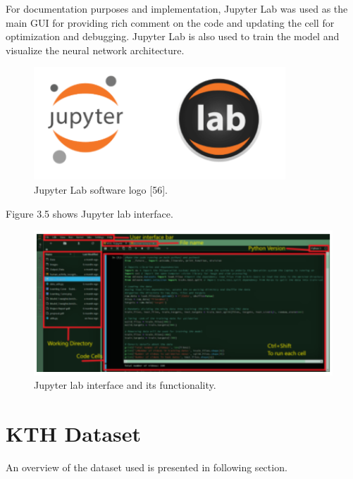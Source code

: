 For documentation purposes and implementation, Jupyter Lab was used as the main GUI for providing rich comment on the code and updating the cell for optimization and debugging. Jupyter Lab is also used to train the model and visualize the neural network architecture.
\begin{figure}[ht]
\centering
\includegraphics{Figures/jupyter_lab}
\decoRule
\caption[Jupyter Lab software logo "56".]{Jupyter Lab software logo [56].}
\label{fig:la}
\end{figure}

Figure 3.5 shows Jupyter lab interface.\\
\begin{figure}[ht]
\centering
\includegraphics{Figures/jl1}
\decoRule
\caption[Jupyter lab interface and its functionality.]{Jupyter lab interface and its functionality.}
\label{fig:la}
\end{figure}

\section{KTH Dataset}
\hspace{5mm} An overview of the dataset used is presented in following section.\\


